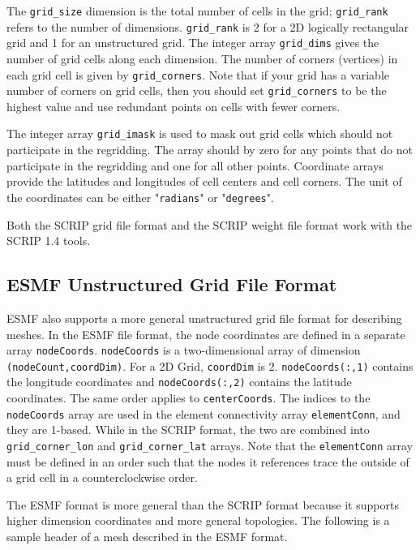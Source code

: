 The {\tt grid\_size} dimension is the total number of cells in the grid; {\tt grid\_rank} refers to the
number of dimensions. {\tt grid\_rank} is 2 for a 2D logically rectangular grid and 1 for an 
unstructured grid. The integer array {\tt grid\_dims} gives the number of grid cells along each dimension. 
The number of corners (vertices) in each grid cell is given by {\tt grid\_corners}.
Note that if your grid has a variable number of corners on grid cells, then
you should set {\tt grid\_corners} to be the highest value and use redundant points
on cells with fewer corners. 

The integer array {\tt grid\_imask} is used to mask out grid cells which should
not participate in the regridding. The array should by zero for any points
that do not participate in the regridding and one for all other points.
Coordinate arrays provide the latitudes and longitudes of cell centers
and cell corners. The unit of the coordinates can be either "{\tt radians}" or "{\tt degrees}". 

Both the SCRIP grid file format and the SCRIP weight file format work with the SCRIP 1.4 tools.

\subsection{ESMF Unstructured Grid File Format}\label{sec:fileformat:esmf}

ESMF also supports a more general unstructured grid file format for describing meshes.
In the ESMF file format, the node coordinates are defined in a separate array
{\tt nodeCoords}. {\tt nodeCoords} is a two-dimensional array of dimension {\tt (nodeCount,coordDim)}.
For a 2D Grid, {\tt coordDim} is 2. {\tt nodeCoords(:,1)} contains the longitude coordinates and
{\tt nodeCoords(:,2)} contains the latitude coordinates.  The same order applies to {\tt centerCoords}.
 The indices to the {\tt nodeCoords} array are used in the element
connectivity array {\tt elementConn}, and they are 1-based. 
While in the SCRIP format, the two are combined into 
{\tt grid\_corner\_lon} and {\tt grid\_corner\_lat} arrays.  
Note that the {\tt elementConn} array must be defined in an order such that the nodes it references trace
the outside of a grid cell in a counterclockwise order.

The ESMF format is more general than the SCRIP format because it supports higher dimension coordinates and 
more general topologies.  
The following is a sample header of a mesh described in the ESMF format.
 
